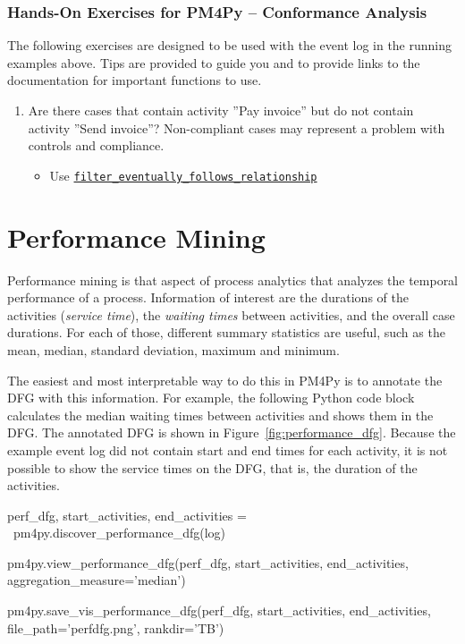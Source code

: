 \begin{tcolorbox}[colback=code]
\subsubsection*{Hands-On Exercises for PM4Py -- Conformance Analysis}

The following exercises are designed to be used with the event log in the running examples above. Tips are provided to guide you and to provide links to the documentation for important functions to use.

\begin{enumerate}
   \item Are there cases that contain activity ''Pay invoice'' but do not contain activity ''Send invoice''? Non-compliant cases may represent a problem with controls and compliance.
   \begin{itemize}
      \item Use \href{https://processintelligence.solutions/static/api/2.7.11/generated/pm4py.filtering.filter_eventually_follows_relation.html}{\texttt{filter\_eventually\_follows\_relationship}}
   \end{itemize}
\end{enumerate}
\end{tcolorbox}

\section{Performance Mining}

Performance mining is that aspect of process analytics that analyzes the temporal performance of a process. Information of interest are the durations of the activities (\emph{service time}), the \emph{waiting times} between activities, and the overall case durations. For each of those, different summary statistics are useful, such as the mean, median, standard deviation, maximum and minimum. 

The easiest and most interpretable way to do this in PM4Py is to annotate the DFG with this information. For example, the following Python code block calculates the median waiting times between activities and shows them in the DFG. The annotated DFG is shown in Figure~\ref{fig:performance_dfg}. Because the example event log did not contain start and end times for each activity, it is not possible to show the service times on the DFG, that is, the duration of the activities.

\begin{samepage}
\begin{pythoncode}
perf_dfg, start_activities, end_activities = \
    pm4py.discover_performance_dfg(log)
    
pm4py.view_performance_dfg(perf_dfg, 
    start_activities, end_activities, 
    aggregation_measure='median')

pm4py.save_vis_performance_dfg(perf_dfg, 
    start_activities, end_activities, 
    file_path='perfdfg.png', rankdir='TB')
\end{pythoncode}
\end{samepage}

